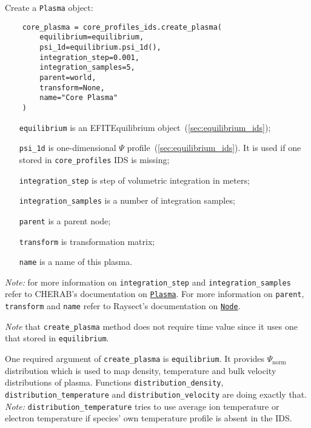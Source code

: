 \documentclass[../main.tex]{subfiles}
\begin{document}
Create a \texttt{Plasma} object:
\begin{verbatim}
    core_plasma = core_profiles_ids.create_plasma(
        equilibrium=equilibrium,
        psi_1d=equilibrium.psi_1d(),
        integration_step=0.001,
        integration_samples=5,
        parent=world,
        transform=None,
        name="Core Plasma"
    )
\end{verbatim}

\begin{itemize}[align=left]
    \item[\texttt{equilibrium}] is an EFITEquilibrium object~(\cref{sec:equilibrium_ids});
    \item[\texttt{psi\_1d}] is one-dimensional $\Psi$ profile~(\cref{sec:equilibrium_ids}). It is used if one stored in \texttt{core\_profiles} IDS is missing;
    \item[\texttt{integration\_step}] is step of volumetric integration in meters;
    \item[\texttt{integration\_samples}] is a number of integration samples;
    \item[\texttt{parent}] is a parent node;
    \item[\texttt{transform}] is transformation matrix;
    \item[\texttt{name}] is a name of this plasma.
\end{itemize}
\emph{Note: } for more information on \texttt{integration\_step} and \texttt{integration\_samples} refer to CHERAB's documentation on \href{https://cherab.github.io/documentation/plasmas/core_plasma_classes.html?highlight=plasma#cherab.core.Plasma}{\texttt{Plasma}}.
For more information on \texttt{parent}, \texttt{transform} and \texttt{name} refer to Raysect's documentation on \href{https://raysect.github.io/documentation/api_reference/core/raysect_core_scenegraph.html?highlight=node#raysect.core.scenegraph.node.Node}{\texttt{Node}}.

\emph{Note} that \texttt{create\_plasma} method does not require time value since it uses one that stored in \texttt{equilibrium}.

One required argument of \texttt{create\_plasma} is \texttt{equilibrium}. It provides $\Psi_\text{norm}$ distribution which is used to map density, temperature and bulk velocity distributions of plasma. Functions \texttt{distribution\_density}, \texttt{distribution\_temperature} and \texttt{distribution\_velocity} are doing exactly that. \emph{Note:} \texttt{distribution\_temperature} tries to use average ion temperature or electron temperature if species' own temperature profile is absent in the IDS.
\end{document}
